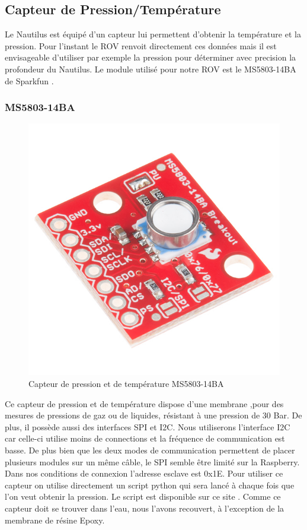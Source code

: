 \documentclass[a4paper,11pt]{report}
\begin{document}
				\subsection{Capteur de Pression/Température}
		Le Nautilus est équipé d'un capteur lui permettent d'obtenir la température et la pression. Pour l'instant le ROV renvoit directement ces données mais il est envisageable d'utiliser par exemple la pression pour déterminer avec precision la profondeur du Nautilus. Le module utilisé pour notre ROV est le MS5803-14BA de Sparkfun \cite{ref11}.
		\newline
		
			\subsubsection{MS5803-14BA}
			\begin{figure}[!h]
					\begin{center}
						\includegraphics[scale=1]{Photos/Capture30.jpg}
						\caption{Capteur de pression et de température MS5803-14BA}
					\end{center}
				\end{figure}
			Ce capteur de pression et de température dispose d'une membrane ,pour des mesures de pressions de gaz ou de liquides, résistant à une pression de 30 Bar. De plus, il possède aussi des interfaces SPI et I2C. Nous utiliserons l'interface I2C car celle-ci utilise moins de connections et la fréquence de communication est basse. De plus bien que les deux modes de communication permettent de placer plusieurs modules sur un même câble, le SPI semble être limité sur la Raspberry. Dans nos conditions de connexion l'adresse esclave est 0x1E. Pour utiliser ce capteur on utilise directement un script python qui sera lancé à chaque fois que l'on veut obtenir la pression. Le script est disponible sur ce site \cite{ref12}.
			Comme ce capteur doit se trouver dans l'eau, nous l'avons recouvert, à l’exception de la membrane de résine Epoxy. \newline
			
\end{document}
